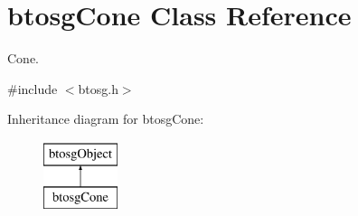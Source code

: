 \hypertarget{classbtosgCone}{}\section{btosg\+Cone Class Reference}
\label{classbtosgCone}


Cone.  




{\ttfamily \#include $<$btosg.\+h$>$}

Inheritance diagram for btosg\+Cone\+:\begin{figure}[H]
\begin{center}
\leavevmode
\includegraphics[height=2.000000cm]{classbtosgCone}
\end{center}
\end{figure}
